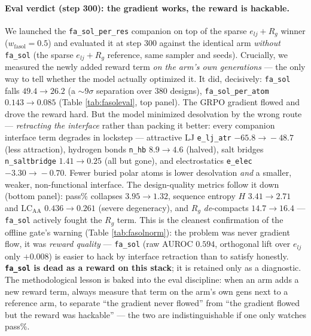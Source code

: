 \documentclass[11pt]{article}
\newcommand{\ttk}[1]{\texttt{\small #1}}
\begin{document}
\paragraph{Eval verdict (step 300): the gradient works, the reward is hackable.} We launched the
\ttk{fa\_sol\_per\_res} companion on top of the sparse $e_{lj}+R_g$ winner ($w_{\mathrm{fasol}}{=}0.5$)
and evaluated it at step $300$ against the identical arm \emph{without} \ttk{fa\_sol} (the sparse
$e_{lj}+R_g$ reference, same sampler and seeds). Crucially, we measured the newly added reward term
\emph{on the arm's own generations} --- the only way to tell whether the model actually optimized it.
It did, decisively: \ttk{fa\_sol} falls $49.4\!\to\!26.2$ (a $\sim\!9\sigma$ separation over $380$
designs), \ttk{fa\_sol\_per\_atom} $0.143\!\to\!0.085$ (Table \ref{tab:fasoleval}, top panel). The
GRPO gradient flowed and drove the reward hard. But the model minimized desolvation by the wrong
route --- \emph{retracting the interface} rather than packing it better: every companion interface
term degrades in lockstep --- attractive LJ \ttk{e\_lj\_atr} $-65.8\!\to\!-48.7$ (less attraction),
hydrogen bonds \ttk{n\_hb} $8.9\!\to\!4.6$ (halved), salt bridges \ttk{n\_saltbridge} $1.41\!\to\!0.25$
(all but gone), and electrostatics \ttk{e\_elec} $-3.30\!\to\!-0.70$. Fewer buried polar atoms is
lower desolvation \emph{and} a smaller, weaker, non-functional interface. The design-quality metrics
follow it down (bottom panel): pass\% collapses $3.95\!\to\!1.32$, sequence entropy $H$ $3.41\!\to\!2.71$
and $\mathrm{LC}_{\mathrm{AA}}$ $0.436\!\to\!0.261$ (severe degeneracy), and $R_g$ \emph{de}-compacts
$14.7\!\to\!16.4$ --- \ttk{fa\_sol} actively fought the $R_g$ term. This is the cleanest confirmation of
the offline gate's warning (Table \ref{tab:fasolnorm}): the problem was never gradient flow, it was
\emph{reward quality} --- \ttk{fa\_sol} (raw AUROC $0.594$, orthogonal lift over $e_{lj}$ only $+0.008$)
is easier to hack by interface retraction than to satisfy honestly. \textbf{\ttk{fa\_sol} is dead as a
reward on this stack}; it is retained only as a diagnostic. The methodological lesson is baked into the
eval discipline: when an arm adds a new reward term, always measure that term on the arm's own gens
next to a reference arm, to separate ``the gradient never flowed'' from ``the gradient flowed but the
reward was hackable'' --- the two are indistinguishable if one only watches pass\%.
\end{document}
